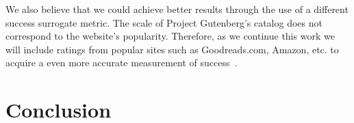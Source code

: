 We also believe that we could achieve better results through the use of a different success surrogate metric.
The scale of Project Gutenberg's catalog does not correspond to the website's popularity.
Therefore, as we continue this work we will include ratings from popular sites such as Goodreads.com, Amazon, etc. to acquire a even more accurate measurement of success~\cite{goodreads}.

\section{Conclusion}\label{sec:conclusion}







